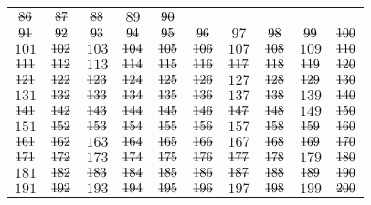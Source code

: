 \begin{mdframed}[style=darkAnswer,frametitle={Joe Starr}]
\begin{center}
\begin{tabular}{| c | c | c | c | c | c | c | c | c | c |}
        $\msout{86}$ & $\msout{87}$ & $\msout{88}$ & $89$ & $\msout{90}$ \\
        \hline
        $\msout{91}$ & $\msout{92}$ & $\msout{93}$ & $\msout{94}$ & $\msout{95}$
        & $\msout{96}$ & $97$ & $\msout{98}$ & $\msout{99}$ & $\msout{100}$ \\
        \hline
        $101$ & $\msout{102}$ & $103$ & $\msout{104}$ & $\msout{105}$ & 
        $\msout{106}$ & $107$ & $\msout{108}$ & $109$ & $\msout{110}$ \\
        \hline
        $\msout{111}$ & $\msout{112}$ & $113$ & $\msout{114}$ & $\msout{115}$ & 
        $\msout{116}$ & $\msout{117}$ & $\msout{118}$ & $\msout{119}$ & 
        $\msout{120}$ \\
        \hline
        $\msout{121}$ & $\msout{122}$ & $\msout{123}$ & $\msout{124}$ & 
        $\msout{125}$ & $\msout{126}$ & $127$ & $\msout{128}$ & $\msout{129}$ & 
        $\msout{130}$ \\
        \hline
        $131$ & $\msout{132}$ & $\msout{133}$ & $\msout{134}$ & $\msout{135}$ & 
        $\msout{136}$ & $137$ & $\msout{138}$ & $139$ & $\msout{140}$ \\
        \hline
        $\msout{141}$ & $\msout{142}$ & $\msout{143}$ & $\msout{144}$ & 
        $\msout{145}$ & $\msout{146}$ & $\msout{147}$ & $\msout{148}$ & $149$ & 
        $\msout{150}$ \\
        \hline
        $151$ & $\msout{152}$ & $\msout{153}$ & $\msout{154}$ & $\msout{155}$ & 
        $\msout{156}$ & $157$ & $\msout{158}$ & $\msout{159}$ & $\msout{160}$ \\
        \hline
        $\msout{161}$ & $\msout{162}$ & $163$ & $\msout{164}$ & $\msout{165}$ & 
        $\msout{166}$ & $167$ & $\msout{168}$ & $\msout{169}$ & $\msout{170}$ \\
        \hline
        $\msout{171}$ & $\msout{172}$ & $173$ & $\msout{174}$ & $\msout{175}$ & 
        $\msout{176}$ & $\msout{177}$ & $\msout{178}$ & $179$ & $\msout{180}$ \\
        \hline
        $181$ & $\msout{182}$ & $\msout{183}$ & $\msout{184}$ & $\msout{185}$ & 
        $\msout{186}$ & $\msout{187}$ & $\msout{188}$ & $\msout{189}$ & 
        $\msout{190}$ \\
        \hline
        $191$ & $\msout{192}$ & $193$ & $\msout{194}$ & $\msout{195}$ & 
        $\msout{196}$ & $197$ & $\msout{198}$ & $199$ & $\msout{200}$\\
        \hline
        \end{tabular}
        \end{center}    
\end{mdframed}
